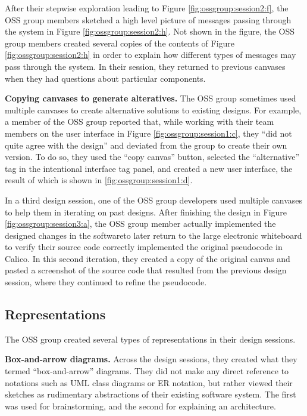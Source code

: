 \documentclass[12pt,fleqn]{ucithesis}
\providecommand{\DIFaddtex}[1]{{\protect\color{blue}\uwave{#1}}} %
\providecommand{\DIFaddbegin}{} %
\providecommand{\DIFaddend}{} %
\providecommand{\DIFadd}[1]{\texorpdfstring{\DIFaddtex{#1}}{#1}} %
\begin{document}
After their stepwise exploration leading to Figure \ref{fig:ossgroup:session2:f}, the OSS group members sketched a high level picture of messages passing through the system in Figure \ref{fig:ossgroup:session2:h}. Not shown in the figure, the OSS group members created several copies of the contents of Figure \ref{fig:ossgroup:session2:h} in order to explain how different types of messages may pass through the system. In their session, they returned to previous canvases when they had questions about particular components.

\textbf{Copying canvases to generate alteratives. } The OSS group sometimes used multiple canvases to create alternative solutions to existing designs. For example, a member of the OSS group reported that, while working with their team members on the user interface in Figure \ref{fig:ossgroup:session1:c}, they ``did not quite agree with the design'' and deviated from the group to create their own version. To do so, they used the ``copy canvas'' button, selected the ``alternative'' tag in the intentional interface tag panel, and created a new user interface, the result of which is shown in  \ref{fig:ossgroup:session1:d}. 

In a third design session, one of the OSS group developers used multiple canvases to help them in iterating on past designs. After finishing the design in Figure \ref{fig:ossgroup:session3:a}, the OSS group member actually implemented the designed changes in the software\DIFaddbegin \DIFadd{, }\DIFaddend to later return to the large electronic whiteboard to verify \DIFaddbegin \DIFadd{that }\DIFaddend their source code correctly implemented the original pseudocode in Calico. In this second iteration, they created a copy of the original canvas and pasted a screenshot of the source code that resulted from the previous design session, where they continued to refine the pseudocode.

\subsection{Representations}

The OSS group created several types of representations in their design sessions.

\textbf{Box-and-arrow diagrams. } Across the design sessions, they created what they termed ``box-and-arrow'' diagrams. They did not make any direct reference to notations such as UML class diagrams or ER notation, but rather viewed their sketches as rudimentary abstractions of their existing software system. The first was used for brainstorming, and the second for explaining an architecture.
\end{document}
